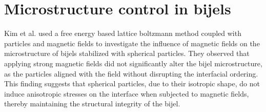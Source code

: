 
\section{Microstructure control in bijels}

Kim et al. used a free energy based lattice boltzmann method coupled with particles and magnetic fields to investigate the influence of magnetic fields on 
the microstructure of bijels stabilized with spherical particles. \cite{kim_bijels_2010}
They observed that applying strong magnetic fields did not significantly alter the bijel microstructure, as the particles aligned with 
the field without disrupting the interfacial ordering. This finding suggests that spherical particles, due to their isotropic shape, do 
not induce anisotropic stresses on the interface when subjected to magnetic fields, thereby maintaining the structural integrity of the bijel.

